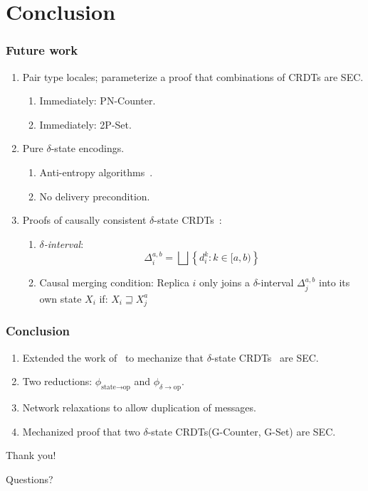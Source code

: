 \documentclass[aspectratio=169,compress,handout]{beamer}
\newcommand*{\CRDTs}{\textsf{CRDTs}\xspace}
\newcommand*{\SEC}{\textsf{SEC}\xspace}
\begin{document}
  \section{Conclusion}
  \begin{frame}
    \frametitle{Future work}
    \begin{enumerate}[<+->]
      \item Pair type locales; parameterize a proof that combinations of \CRDTs
        are \SEC.
        \begin{enumerate}[<+->]
          \item Immediately: PN-Counter.
          \item Immediately: 2P-Set.
        \end{enumerate}
      \item Pure $\delta$-state encodings.
        \begin{enumerate}[<+->]
          \item Anti-entropy algorithms~\citep{almedia18}.
          \item No delivery precondition.
        \end{enumerate}
      \item Proofs of causally consistent $\delta$-state
        \CRDTs~\citep{almedia18}:
        \begin{enumerate}[<+->]
          \item \emph{$\delta$-interval}:
            \[
              \Delta^{a,b}_i = \bigsqcup \left\{ d_i^k : k \in [a, b) \right\}
            \]
          \item Causal merging condition: Replica $i$ only joins a
            $\delta$-interval $\Delta^{a,b}_j$ into its own state $X_i$ if: $X_i
            \sqsupseteq X_j^a$
        \end{enumerate}
    \end{enumerate}
  \end{frame}

  \begin{frame}
    \frametitle{Conclusion}

    \begin{enumerate}[<+->]
      \item Extended the work of~\citet{gomes17} to mechanize that
        $\delta$-state \CRDTs~\citep{almedia18} are \SEC.
      \item Two reductions: $\phi_{\text{state}\to\text{op}}$ and
        $\phi_{\delta\to\text{op}}$.
      \item Network relaxations to allow duplication of messages.
      \item Mechanized proof that two $\delta$-state \CRDTs (G-Counter, G-Set)
        are \SEC.
    \end{enumerate}
  \end{frame}

  \begin{frame}
    \centering
    \huge{Thank you!}

    \pause
    Questions?
  \end{frame}

  \begin{frame}[allowframebreaks]
    
    
  \end{frame}
\end{document}
